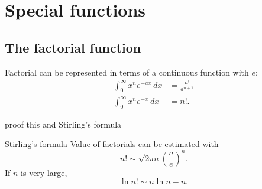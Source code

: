\section{Special functions}

\subsection{The factorial function}

Factorial can be represented in terms of a continuous function with $e$:
\begin{align*}
  \int_{0}^{\infty}x^{n}e^{-a x}\,dx&=\frac{n!}{a^{n+1}} \\
  \int_{0}^{\infty}x^{n}e^{-x}\,dx&=n!.
\end{align*}

\TODO proof this and Stirling's formula

\begin{fact}{Stirling's formula}{}
  Value of factorials can be estimated with
  \begin{equation*}
    n!\sim \sqrt{2\pi n}\left(\frac{n}{e}\right)^n.
  \end{equation*}
  If $n$ is very large,
  \begin{equation*}
    \ln n! \sim n\ln n -n.
  \end{equation*}
\end{fact}



